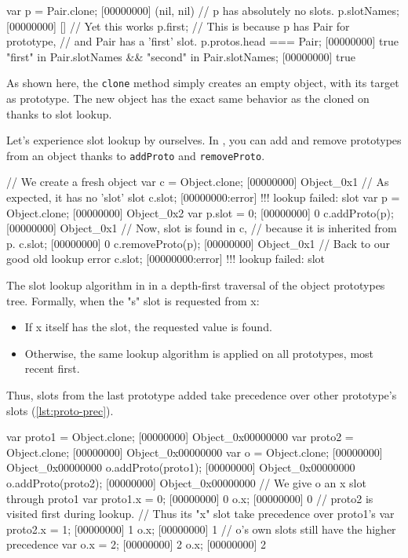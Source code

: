 \begin{urbiscript}[caption=Slot found by lookup, label=lst:simple-lookup]
var p = Pair.clone;
[00000000] (nil, nil)
// p has absolutely no slots.
p.slotNames;
[00000000] []
// Yet this works
p.first;
// This is because p has Pair for prototype,
// and Pair has a 'first' slot.
p.protos.head === Pair;
[00000000] true
"first" in Pair.slotNames && "second" in Pair.slotNames;
[00000000] true
\end{urbiscript}

As shown here, the \texttt{clone} method simply creates an empty
object, with its target as prototype. The new object has the exact
same behavior as the cloned on thanks to slot lookup.

Let's experience slot lookup by ourselves. In \urbi, you can add and
remove prototypes from an object thanks to \texttt{addProto} and
\texttt{removeProto}.

\begin{urbiscript}[caption=Manipulating prototypes, label=lst:proto-change]
// We create a fresh object
var c = Object.clone;
[00000000] Object_0x1
// As expected, it has no 'slot' slot
c.slot;
[00000000:error] !!! lookup failed: slot
var p = Object.clone;
[00000000] Object_0x2
var p.slot = 0;
[00000000] 0
c.addProto(p);
[00000000] Object_0x1
// Now, slot is found in c,
// because it is inherited from p.
c.slot;
[00000000] 0
c.removeProto(p);
[00000000] Object_0x1
// Back to our good old lookup error
c.slot;
[00000000:error] !!! lookup failed: slot
\end{urbiscript}

The slot lookup algorithm in \urbi in a depth-first traversal of the
object prototypes tree. Formally, when the "s" slot is requested from
x:

\begin{itemize}
\item If x itself has the slot, the requested value is found.
\item Otherwise, the same lookup algorithm is applied on all
  prototypes, most recent first.
\end{itemize}

Thus, slots from the last prototype added take precedence over other
prototype's slots (\autoref{lst:proto-prec}).

\begin{urbiscript}[caption=Prototype precedence, label=lst:proto-prec]
var proto1 = Object.clone;
[00000000] Object_0x00000000
var proto2 = Object.clone;
[00000000] Object_0x00000000
var o = Object.clone;
[00000000] Object_0x00000000
o.addProto(proto1);
[00000000] Object_0x00000000
o.addProto(proto2);
[00000000] Object_0x00000000
// We give o an x slot through proto1
var proto1.x = 0;
[00000000] 0
o.x;
[00000000] 0
// proto2 is visited first during lookup.
// Thus its "x" slot take precedence over proto1's
var proto2.x = 1;
[00000000] 1
o.x;
[00000000] 1
// o's own slots still have the higher precedence
var o.x = 2;
[00000000] 2
o.x;
[00000000] 2
\end{urbiscript}


